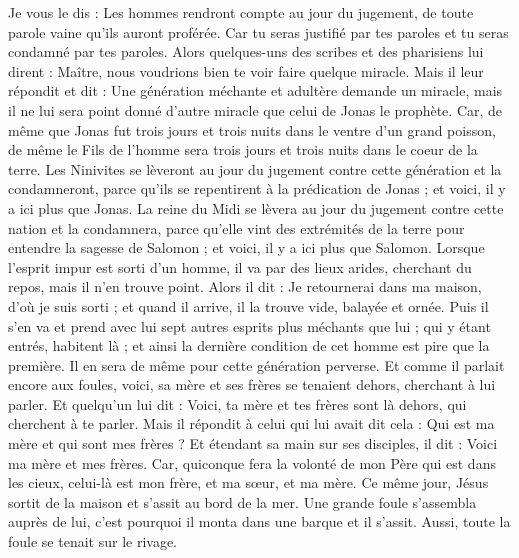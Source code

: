 \begin{multicols}{2}
Je vous le dis : Les hommes rendront compte au jour du jugement, de toute parole vaine qu'ils auront proférée.
Car tu seras justifié par tes paroles et tu seras condamné par tes paroles.
Alors quelques-uns des scribes et des pharisiens lui dirent : Maître, nous voudrions bien te voir faire quelque miracle.
Mais il leur répondit et dit : Une génération méchante et adultère demande un miracle, mais il ne lui sera point donné d'autre miracle que celui de Jonas le prophète.
Car, de même que Jonas fut trois jours et trois nuits dans le ventre d'un grand poisson, de même le Fils de l'homme sera trois jours et trois nuits dans le coeur de la terre.
Les Ninivites se lèveront au jour du jugement contre cette génération et la condamneront, parce qu'ils se repentirent à la prédication de Jonas ; et voici, il y a ici plus que Jonas.
La reine du Midi se lèvera au jour du jugement contre cette nation et la condamnera, parce qu'elle vint des extrémités de la terre pour entendre la sagesse de Salomon ; et voici, il y a ici plus que Salomon.
Lorsque l'esprit impur est sorti d'un homme, il va par des lieux arides, cherchant du repos, mais il n'en trouve point.
Alors il dit : Je retournerai dans ma maison, d'où je suis sorti ; et quand il arrive, il la trouve vide, balayée et ornée.
Puis il s'en va et prend avec lui sept autres esprits plus méchants que lui ; qui y étant entrés, habitent là ; et ainsi la dernière condition de cet homme est pire que la première. Il en sera de même pour cette génération perverse.
Et comme il parlait encore aux foules, voici, sa mère et ses frères se tenaient dehors, cherchant à lui parler.
Et quelqu'un lui dit : Voici, ta mère et tes frères sont là dehors, qui cherchent à te parler.
Mais il répondit à celui qui lui avait dit cela : Qui est ma mère et qui sont mes frères ?
Et étendant sa main sur ses disciples, il dit : Voici ma mère et mes frères.
Car, quiconque fera la volonté de mon Père qui est dans les cieux, celui-là est mon frère, et ma sœur, et ma mère.
\VerseOne{}Ce même jour, Jésus sortit de la maison et s'assit au bord de la mer.
Une grande foule s'assembla auprès de lui, c'est pourquoi il monta dans une barque et il s'assit. Aussi, toute la foule se tenait sur le rivage.

\end{multicols}
